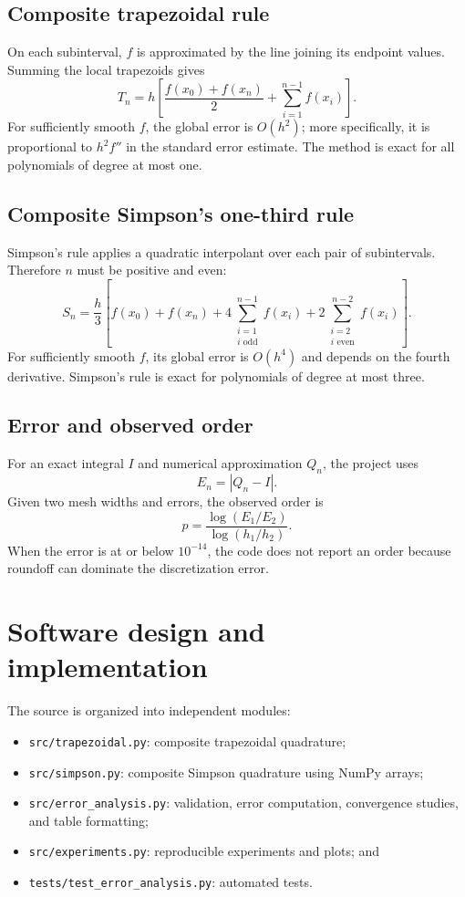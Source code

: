 \documentclass[11pt]{article}
\begin{document}
\subsection{Composite trapezoidal rule}
On each subinterval, $f$ is approximated by the line joining its endpoint values. Summing the local trapezoids gives
\[
 T_n=h\left[\frac{f(x_0)+f(x_n)}{2}+\sum_{i=1}^{n-1}f(x_i)\right].
\]
For sufficiently smooth $f$, the global error is $O(h^2)$; more specifically, it is proportional to $h^2 f''$ in the standard error estimate. The method is exact for all polynomials of degree at most one.

\subsection{Composite Simpson's one-third rule}
Simpson's rule applies a quadratic interpolant over each pair of subintervals. Therefore $n$ must be positive and even:
\[
 S_n=\frac{h}{3}\left[f(x_0)+f(x_n)+4\sum_{\substack{i=1\\i\text{ odd}}}^{n-1}f(x_i)+2\sum_{\substack{i=2\\i\text{ even}}}^{n-2}f(x_i)\right].
\]
For sufficiently smooth $f$, its global error is $O(h^4)$ and depends on the fourth derivative. Simpson's rule is exact for polynomials of degree at most three.

\subsection{Error and observed order}
For an exact integral $I$ and numerical approximation $Q_n$, the project uses
\[
 E_n=|Q_n-I|.
\]
Given two mesh widths and errors, the observed order is
\[
 p=\frac{\log(E_1/E_2)}{\log(h_1/h_2)}.
\]
When the error is at or below $10^{-14}$, the code does not report an order because roundoff can dominate the discretization error.

\section{Software design and implementation}
The source is organized into independent modules:
\begin{itemize}
  \item \texttt{src/trapezoidal.py}: composite trapezoidal quadrature;
  \item \texttt{src/simpson.py}: composite Simpson quadrature using NumPy arrays;
  \item \texttt{src/error\_analysis.py}: validation, error computation, convergence studies, and table formatting;
  \item \texttt{src/experiments.py}: reproducible experiments and plots; and
  \item \texttt{tests/test\_error\_analysis.py}: automated tests.
\end{itemize}
\end{document}
